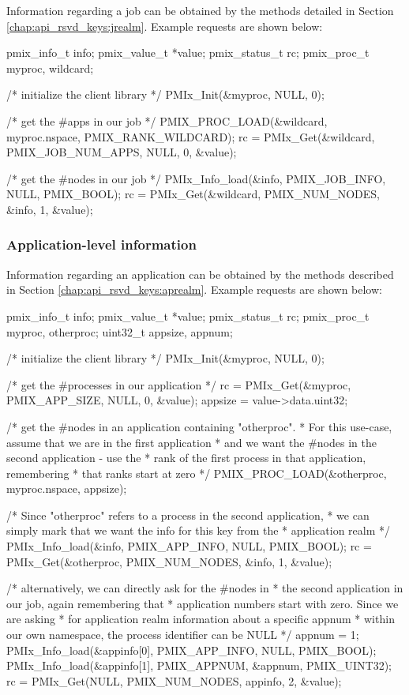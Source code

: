 Information regarding a job can be obtained by the methods detailed in Section \ref{chap:api_rsvd_keys:jrealm}. Example requests are shown below:

\cspecificstart
\begin{codepar}
pmix_info_t info;
pmix_value_t *value;
pmix_status_t rc;
pmix_proc_t myproc, wildcard;

/* initialize the client library */
PMIx_Init(&myproc, NULL, 0);

/* get the #apps in our job */
PMIX_PROC_LOAD(&wildcard, myproc.nspace, PMIX_RANK_WILDCARD);
rc = PMIx_Get(&wildcard, PMIX_JOB_NUM_APPS, NULL, 0, &value);

/* get the #nodes in our job */
PMIx_Info_load(&info, PMIX_JOB_INFO, NULL, PMIX_BOOL);
rc = PMIx_Get(&wildcard, PMIX_NUM_NODES, &info, 1, &value);
\end{codepar}
\cspecificend


\subsubsection{Application-level information}

Information regarding an application can be obtained by the methods described in Section \ref{chap:api_rsvd_keys:aprealm}. Example requests are shown below:

\cspecificstart
\begin{codepar}
pmix_info_t info;
pmix_value_t *value;
pmix_status_t rc;
pmix_proc_t myproc, otherproc;
uint32_t appsize, appnum;

/* initialize the client library */
PMIx_Init(&myproc, NULL, 0);

/* get the #processes in our application */
rc = PMIx_Get(&myproc, PMIX_APP_SIZE, NULL, 0, &value);
appsize = value->data.uint32;

/* get the #nodes in an application containing "otherproc".
 * For this use-case, assume that we are in the first application
 * and we want the #nodes in the second application - use the
 * rank of the first process in that application, remembering
 * that ranks start at zero */
PMIX_PROC_LOAD(&otherproc, myproc.nspace, appsize);

/* Since "otherproc" refers to a process in the second application,
 * we can simply mark that we want the info for this key from the
 * application realm */
PMIx_Info_load(&info, PMIX_APP_INFO, NULL, PMIX_BOOL);
rc = PMIx_Get(&otherproc, PMIX_NUM_NODES, &info, 1, &value);

/* alternatively, we can directly ask for the #nodes in
 * the second application in our job, again remembering that
 * application numbers start with zero. Since we are asking
 * for application realm information about a specific appnum
 * within our own namespace, the process identifier can be NULL */
appnum = 1;
PMIx_Info_load(&appinfo[0], PMIX_APP_INFO, NULL, PMIX_BOOL);
PMIx_Info_load(&appinfo[1], PMIX_APPNUM, &appnum, PMIX_UINT32);
rc = PMIx_Get(NULL, PMIX_NUM_NODES, appinfo, 2, &value);
\end{codepar}
\cspecificend


